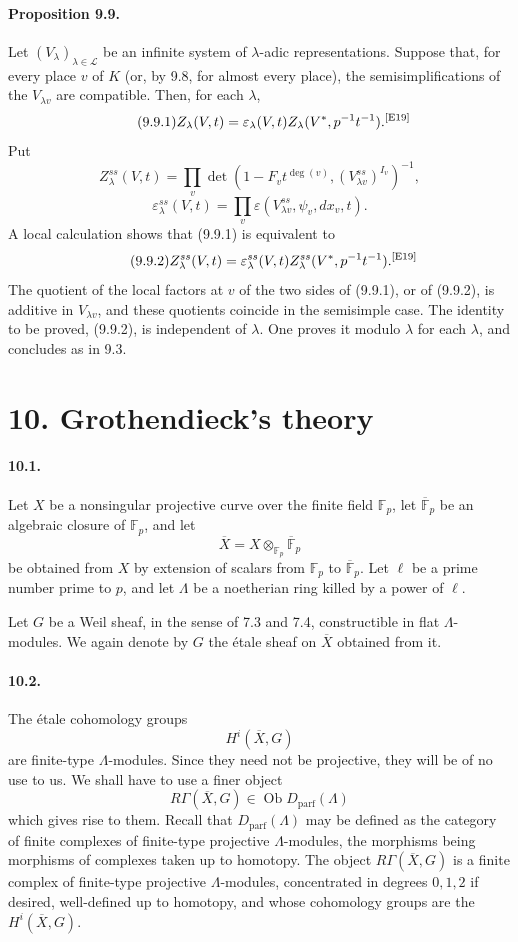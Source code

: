 \documentclass[10pt,letterpaper]{article}
\newcommand{\F}{\mathbb F}
\providecommand{\LLL}{\mathcal L}
\providecommand{\Dparf}{D_{\mathrm{parf}}}
\newcommand{\auditmark}[1]{\textsuperscript{\normalfont\scriptsize[E#1]}}
\begin{document}
\paragraph{Proposition 9.9.} Let $(V_\lambda)_{\lambda\in\LLL}$ be an infinite system of $\lambda$-adic representations. Suppose that, for every place $v$ of $K$ (or, by 9.8, for almost every place), the semisimplifications of the $V_{\lambda v}$ are compatible. Then, for each $\lambda$,
\[
\tag{9.9.1}
Z_\lambda(V,t)=\varepsilon_\lambda(V,t)Z_\lambda(V^*,p^{-1}t^{-1}).\auditmark{19}
\]
Put
\[
Z_\lambda^{ss}(V,t)=
\prod_v\det(1-F_vt^{\deg(v)},(V_{\lambda v}^{ss})^{I_v})^{-1},
\]
\[
\varepsilon_\lambda^{ss}(V,t)=
\prod_v\varepsilon(V_{\lambda v}^{ss},\psi_v,dx_v,t).
\]
A local calculation shows that (9.9.1) is equivalent to
\[
\tag{9.9.2}
Z_\lambda^{ss}(V,t)=
\varepsilon_\lambda^{ss}(V,t)Z_\lambda^{ss}(V^*,p^{-1}t^{-1}).\auditmark{19}
\]
The quotient of the local factors at $v$ of the two sides of (9.9.1), or of (9.9.2), is additive in $V_{\lambda v}$, and these quotients coincide in the semisimple case. The identity to be proved, (9.9.2), is independent of $\lambda$. One proves it modulo $\lambda$ for each $\lambda$, and concludes as in 9.3.




\section*{10. Grothendieck's theory}

\paragraph{10.1.} Let \(X\) be a nonsingular projective curve over the finite field \(\F_p\), let \(\overline{\F}_p\) be an algebraic closure of \(\F_p\), and let
\[
\overline X=X\otimes_{\F_p}\overline{\F}_p
\]
be obtained from \(X\) by extension of scalars from \(\F_p\) to \(\overline{\F}_p\). Let \(\ell\) be a prime number prime to \(p\), and let \(\Lambda\) be a noetherian ring killed by a power of \(\ell\).

Let \(G\) be a Weil sheaf, in the sense of 7.3 and 7.4, constructible in flat \(\Lambda\)-modules. We again denote by \(G\) the étale sheaf on \(\overline X\) obtained from it.

\paragraph{10.2.} The étale cohomology groups
\[
H^i(\overline X,G)
\]
are finite-type \(\Lambda\)-modules. Since they need not be projective, they will be of no use to us. We shall have to use a finer object
\[
R\Gamma(\overline X,G)\in\operatorname{Ob}\Dparf(\Lambda)
\]
which gives rise to them. Recall that \(\Dparf(\Lambda)\) may be defined as the category of finite complexes of finite-type projective \(\Lambda\)-modules, the morphisms being morphisms of complexes taken up to homotopy. The object \(R\Gamma(\overline X,G)\) is a finite complex of finite-type projective \(\Lambda\)-modules, concentrated in degrees \(0,1,2\) if desired, well-defined up to homotopy, and whose cohomology groups are the \(H^i(\overline X,G)\).
\end{document}
